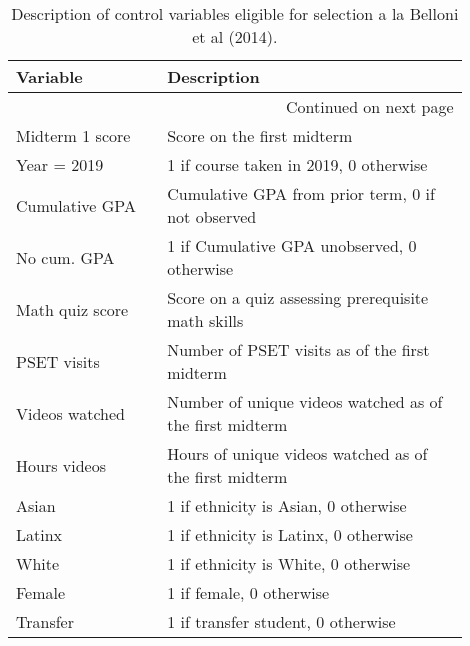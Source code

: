 \begin{spacing}{1.0}\centering 
\begin{longtable}{p{0.3\linewidth} p{0.6\linewidth}}
\caption{Description of control variables eligible for selection a la Belloni et al (2014).}\label{controlvars_desc}\\
\toprule
        Variable &                                              Description \\
\midrule
\endhead
\midrule
\multicolumn{2}{r}{{Continued on next page}} \\
\midrule
\endfoot

\bottomrule
\endlastfoot
 Midterm 1 score &                               Score on the first midterm \\
     Year = 2019 &                   1 if course taken in 2019, 0 otherwise \\
  Cumulative GPA &        Cumulative GPA from prior term, 0 if not observed \\
     No cum. GPA &              1 if Cumulative GPA unobserved, 0 otherwise \\
 Math quiz score &       Score on a quiz assessing prerequisite math skills \\
     PSET visits &            Number of PSET visits as of the first midterm \\
  Videos watched &  Number of unique videos watched as of the first midterm \\
    Hours videos &   Hours of unique videos watched as of the first midterm \\
           Asian &                     1 if ethnicity is Asian, 0 otherwise \\
          Latinx &                    1 if ethnicity is Latinx, 0 otherwise \\
           White &                     1 if ethnicity is White, 0 otherwise \\
          Female &                                 1 if female, 0 otherwise \\
        Transfer &                       1 if transfer student, 0 otherwise \\
\end{longtable}
\end{spacing}